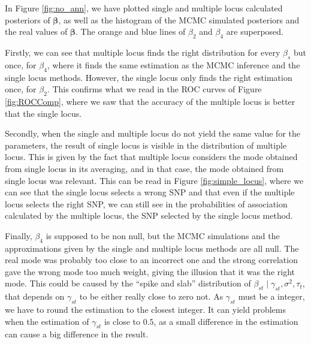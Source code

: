 \documentclass[a4paper, 11pt]{report}
\numberwithin{equation}{chapter}
\begin{document}
In Figure \ref{fig:no_ann}, we have plotted single and multiple locus calculated posteriors of $\boldsymbol{\beta}$, as well as the histogram of the MCMC simulated posteriors and the real values of $\boldsymbol{\beta}$. The orange and blue lines of $\beta_2$ and $\beta_4$ are superposed.

Firstly, we can see that multiple locus finds the right distribution for every $\beta_s$ but once, for $\beta_4$, where it finds the same estimation as the MCMC inference and the single locus methods. However, the single locus only finds the right estimation once, for $\beta_2$. This confirms what we read in the ROC curves of Figure \ref{fig:ROCComp}, where we saw that the accuracy of the multiple locus is better that the single locus.

Secondly, when the single and multiple locus do not yield the same value for the parameters, the result of single locus is visible in the distribution of multiple locus. This is given by the fact that multiple locus considers the mode obtained from single locus in its averaging, and in that case, the mode obtained from single locus was relevant. This can be read in Figure \ref{fig:simple_locus}, where we can see that the single locus selects a wrong SNP and that even if the multiple locus selects the right SNP, we can still see in the probabilities of association calculated by the multiple locus, the SNP selected by the single locus method.

Finally, $\beta_4$ is supposed to be non null, but the MCMC simulations and the approximations given by the single and multiple locus methods are all null. The real mode was probably too close to an incorrect one and the strong correlation gave the wrong mode too much weight, giving the illusion that it was the right mode. This could be caused by the ``spike and slab'' distribution of $\beta_{st}\mid \gamma_{st}, \sigma^2, \tau_t$, that depends on $\gamma_{st}$ to be either really close to zero not. As $\gamma_{st}$ must be a integer, we have to round the estimation to the closest integer. It can yield problems when the estimation of $\gamma_{st}$ is close to $0.5$, as a small difference in the estimation can cause a big difference in the result.
\end{document}
